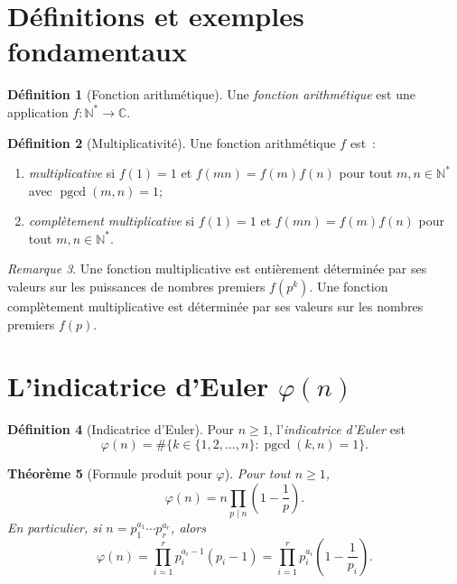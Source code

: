 \documentclass[12pt,a4paper,openany]{book}
\theoremstyle{definition}
\newtheorem{definition}{Définition}[chapter]
\theoremstyle{plain}
\newtheorem{theoreme}[definition]{Théorème}
\theoremstyle{remark}
\newtheorem{remarque}[definition]{Remarque}
\newcommand{\N}{\mathbb{N}}
\newcommand{\C}{\mathbb{C}}
\DeclareMathOperator{\pgcd}{pgcd}
\begin{document}
\section{Définitions et exemples fondamentaux}
\label{sec:fonctions-definitions}

\begin{definition}[Fonction arithmétique]
\label{def:fonction-arithmetique}
Une \emph{fonction arithmétique} est une application $f : \N^* \to \C$.
\end{definition}

\begin{definition}[Multiplicativité]
\label{def:multiplicativite}
Une fonction arithmétique $f$ est~:
\begin{enumerate}[label=(\roman*)]
  \item \emph{multiplicative} si $f(1) = 1$ et $f(mn) = f(m)f(n)$ pour tout
    $m, n \in \N^*$ avec $\pgcd(m,n) = 1$;
  \item \emph{complètement multiplicative} si $f(1) = 1$ et $f(mn) = f(m)f(n)$ pour tout
    $m, n \in \N^*$.
\end{enumerate}
\end{definition}

\begin{remarque}
\label{rem:multiplicative-determination}
Une fonction multiplicative est entièrement déterminée par ses valeurs sur les puissances
de nombres premiers $f(p^k)$. Une fonction complètement multiplicative est déterminée par
ses valeurs sur les nombres premiers $f(p)$.
\end{remarque}

\section{L'indicatrice d'Euler $\varphi(n)$}
\label{sec:euler-phi}

\begin{definition}[Indicatrice d'Euler]
\label{def:euler-phi}
Pour $n \geq 1$, l'\emph{indicatrice d'Euler} est
\[
  \varphi(n) = \#\{k \in \{1, 2, \ldots, n\} : \pgcd(k, n) = 1\}.
\]
\end{definition}

\begin{theoreme}[Formule produit pour $\varphi$]
\label{thm:formule-phi}
Pour tout $n \geq 1$,
\[
  \varphi(n) = n \prod_{p \mid n} \left(1 - \frac{1}{p}\right).
\]
En particulier, si $n = p_1^{a_1} \cdots p_r^{a_r}$, alors
\[
  \varphi(n) = \prod_{i=1}^{r} p_i^{a_i - 1}(p_i - 1)
    = \prod_{i=1}^{r} p_i^{a_i}\left(1 - \frac{1}{p_i}\right).
\]
\end{theoreme}
\end{document}

